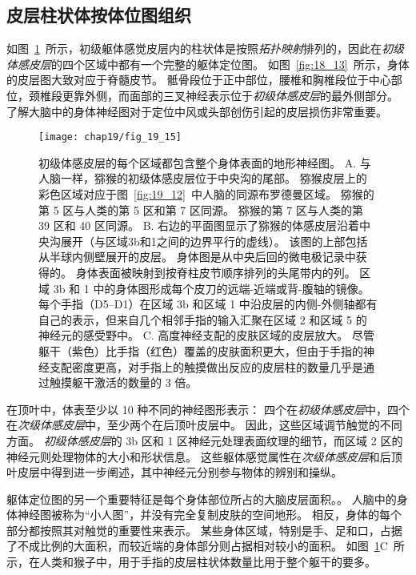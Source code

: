 \subsection{皮层柱状体按体位图组织}

如图~\ref{fig:19_15}~所示，初级躯体感觉皮层内的柱状体是按照\textit{拓扑映射}排列的，因此在\textit{初级体感皮层}的四个区域中都有一个完整的躯体定位图。
如图~\ref{fig:18_13}~所示，身体的皮层图大致对应于脊髓皮节。
骶骨段位于正中部位，腰椎和胸椎段位于中心部位，颈椎段更靠外侧，而面部的三叉神经表示位于\textit{初级体感皮层}的最外侧部分。
了解大脑中的身体神经图对于定位中风或头部创伤引起的皮层损伤非常重要。


\begin{figure}[htbp]
	\centering
	\texttt{[image: chap19/fig\_19\_15]}
	\caption{初级体感皮层的每个区域都包含整个身体表面的地形神经图\cite{nelson1980representations}。
		A. 与人脑一样，猕猴的初级体感皮层位于中央沟的尾部。
		猕猴皮层上的彩色区域对应于图~\ref{fig:19_12}~中人脑的同源布罗德曼区域。
		猕猴的第 5 区与人类的第 5 区和第 7 区同源。
		猕猴的第 7 区与人类的第 39 区和 40 区同源。
		B. 右边的平面图显示了猕猴的体感皮层沿着中央沟展开（与区域3b和1之间的边界平行的虚线）。
		该图的上部包括从半球内侧壁展开的皮层。
		身体图是从中央后回的微电极记录中获得的。
		身体表面被映射到按脊柱皮节顺序排列的头尾带内的列。
		区域 3b 和 1 中的身体图形成每个皮刀的远端-近端或背-腹轴的镜像。
		每个手指（D5–D1）在区域 3b 和区域 1 中沿皮层的内侧-外侧轴都有自己的表示，但来自几个相邻手指的输入汇聚在区域 2 和区域 5 的神经元的感受野中。
		C. 高度神经支配的皮肤区域的皮层放大。
		尽管躯干（紫色）比手指（红色）覆盖的皮肤面积更大，但由于手指的神经支配密度更高，对手指上的触摸做出反应的皮层柱的数量几乎是通过触摸躯干激活的数量的 3 倍。}
	\label{fig:19_15}
\end{figure}


在顶叶中，体表至少以 10 种不同的神经图形表示：
四个在\textit{初级体感皮层}中，四个在\textit{次级体感皮层}中，至少两个在后顶叶皮层中。
因此，这些区域调节触觉的不同方面。
\textit{初级体感皮层}的 3b 区和 1 区神经元处理表面纹理的细节，而区域 2 区的神经元则处理物体的大小和形状信息。
这些躯体感觉属性在\textit{次级体感皮层}和后顶叶皮层中得到进一步阐述，其中神经元分别参与物体的辨别和操纵。


躯体定位图的另一个重要特征是每个身体部位所占的大脑皮层面积。。
人脑中的身体神经图被称为“小人图”，并没有完全复制皮肤的空间地形。
相反，身体的每个部分都按照其对触觉的重要性来表示。 
某些身体区域，特别是手、足和口，占据了不成比例的大面积，而较近端的身体部分则占据相对较小的面积。
如图~\ref{fig:19_15}C~所示，在人类和猴子中，用于手指的皮层柱状体数量比用于整个躯干的要多。


